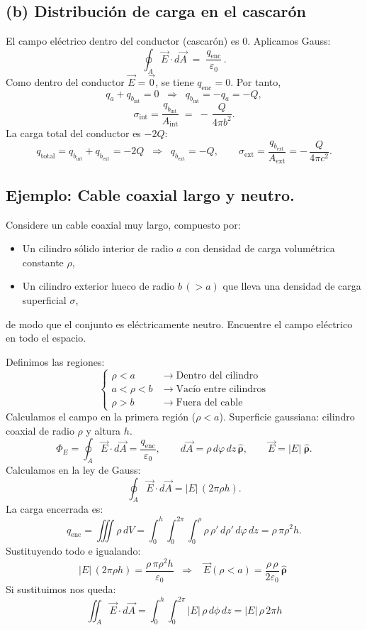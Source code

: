 \documentclass[a4paper,12pt]{article}
\begin{document}
\subsection*{(b) Distribución de carga en el cascarón}
\noindent
El campo eléctrico dentro del conductor (cascarón) es \(0\). Aplicamos Gauss:
\[
\oint_{A} \vec E\cdot d\vec A \;=\; \frac{q_{\text{enc}}}{\varepsilon_0}\,.
\]
Como dentro del conductor \( \vec E=\vec 0 \), se tiene \( q_{\text{enc}}=0 \). Por tanto,
\[
q_a + q_{b_{\text{int}}} = 0 \;\;\Longrightarrow\;\; q_{b_{\text{int}}}=-q_a=-Q,
\]
\[
\sigma_{\text{int}}=\frac{q_{b_{\text{int}}}}{A_{\text{int}}} \;=\; -\,\frac{Q}{4\pi b^{2}}.
\]
La carga total del conductor es \(-2Q\):
\[
q_{\text{total}} = q_{b_{\text{int}}}+q_{b_{\text{ext}}}=-2Q
\;\;\Longrightarrow\;\;
q_{b_{\text{ext}}}=-Q,
\qquad
\sigma_{\text{ext}}=\frac{q_{b_{\text{ext}}}}{A_{\text{ext}}}=-\,\frac{Q}{4\pi c^{2}}.
\]

\subsection*{Ejemplo: Cable coaxial largo y neutro.}
\noindent
Considere un cable coaxial muy largo, compuesto por:
\begin{itemize}[leftmargin=1.2em]
  \item Un cilindro sólido interior de radio \(a\) con densidad de carga volumétrica constante \(\rho\),
  \item Un cilindro exterior hueco de radio \(b\,(>a)\) que lleva una densidad de carga superficial \(\sigma\),
\end{itemize}
de modo que el conjunto es eléctricamente neutro. Encuentre el campo eléctrico en todo el espacio.

\medskip
\noindent
Definimos las regiones:
\[
\left\{
\begin{aligned}
\rho < a      &\;\rightarrow\; \text{Dentro del cilindro} \\
a < \rho < b  &\;\rightarrow\; \text{Vacío entre cilindros} \\
\rho > b      &\;\rightarrow\; \text{Fuera del cable}
\end{aligned}
\right.
\]
Calculamos el campo en la primera región (\(\rho<a\)).  
Superficie gaussiana: cilindro coaxial de radio \(\rho\) y altura \(h\).
\[
\Phi_E=\oint_{A}\vec E\cdot d\vec A=\frac{q_{\text{enc}}}{\varepsilon_0},\qquad
d\vec A=\rho\,d\varphi\,dz\,\hat{\boldsymbol \rho},\qquad
\vec E=|\!E|\;\hat{\boldsymbol \rho}.
\]
Calculamos en la ley de Gauss:
\[
\oint_{A}\vec E\cdot d\vec A = |\!E|\,(2\pi \rho h).
\]
La carga encerrada es:
\[
q_{\text{enc}}=\iiint \rho\, dV
=\int_{0}^{h}\!\!\int_{0}^{2\pi}\!\!\int_{0}^{\rho}\rho\,\rho'\,d\rho'\,d\varphi\,dz
=\rho\,\pi \rho^{2} h.
\]
Sustituyendo todo e igualando:
\[
|\!E|\,(2\pi \rho h)=\frac{\rho\,\pi \rho^{2} h}{\varepsilon_0}
\;\;\Longrightarrow\;\;
\boxed{\;\vec E(\rho<a)=\dfrac{\rho\,\rho}{2\varepsilon_0}\,\hat{\boldsymbol \rho}\;}
\]
\newpage
\noindent
Si sustituimos nos queda:
\[
\iint_{A} \vec{E}\cdot d\vec{A}
=\int_{0}^{h}\!\!\int_{0}^{2\pi} |E|\,\rho\, d\phi\, dz
=|E|\,\rho\,2\pi h
\]
\end{document}
